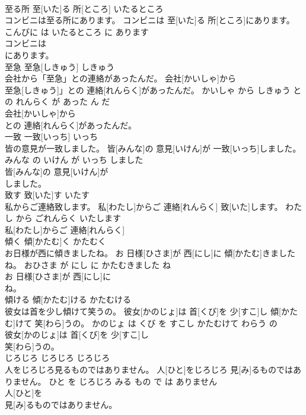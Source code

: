 \documentclass[8pt]{extreport}
\begin{document}
\begin{CJK}{UTF8}{min}
\\	至る所	至[いた]る 所[ところ]	いたるところ	
\\	コンビニは至る所にあります。	コンビニは 至[いた]る 所[ところ]にあります。	こんびに は いたるところ に あります	
\\	コンビニは
\\	にあります。			
\\	至急	至急[しきゅう]	しきゅう	
\\	会社から「至急」との連絡があったんだ。	会社[かいしゃ]から
\\	至急[しきゅう]」との 連絡[れんらく]があったんだ。	かいしゃ から しきゅう と の れんらく が あった ん だ	
\\	会社[かいしゃ]から
\\	との 連絡[れんらく]があったんだ。			
\\	一致	一致[いっち]	いっち	
\\	皆の意見が一致しました。	皆[みんな]の 意見[いけん]が 一致[いっち]しました。	みんな の いけん が いっち しました	
\\	皆[みんな]の 意見[いけん]が
\\	しました。			
\\	致す	致[いた]す	いたす	
\\	私からご連絡致します。	私[わたし]からご 連絡[れんらく] 致[いた]します。	わたし から ごれんらく いたします	
\\	私[わたし]からご 連絡[れんらく]
\\	傾く	傾[かたむ]く	かたむく	
\\	お日様が西に傾きましたね。	お 日様[ひさま]が 西[にし]に 傾[かたむ]きましたね。	おひさま が にし に かたむきました ね	
\\	お 日様[ひさま]が 西[にし]に
\\	ね。			
\\	傾ける	傾[かたむ]ける	かたむける	
\\	彼女は首を少し傾けて笑うの。	彼女[かのじょ]は 首[くび]を 少[すこ]し 傾[かたむ]けて 笑[わら]うの。	かのじょ は くび を すこし かたむけて わらう の	
\\	彼女[かのじょ]は 首[くび]を 少[すこ]し
\\	笑[わら]うの。			
\\	じろじろ	じろじろ	じろじろ	
\\	人をじろじろ見るものではありません。	人[ひと]をじろじろ 見[み]るものではありません。	ひと を じろじろ みる もの で は ありません	
\\	人[ひと]を
\\	見[み]るものではありません。			

\end{CJK}
\end{document}
